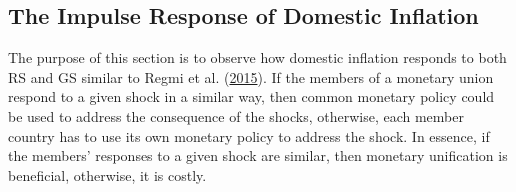 \documentclass[]{article}
\begin{document}
\begin{table}[t]

\caption{\label{tab:tab-def}Sample, Model and Definition of Global Variable}
\centering
{}
\end{table}

\FloatBarrier

\hypertarget{the-impulse-response-of-domestic-inflation}{%
\subsection{The Impulse Response of Domestic Inflation}\label{the-impulse-response-of-domestic-inflation}}

The purpose of this section is to observe how domestic inflation responds to both RS and GS similar to Regmi et al. (\protect\hyperlink{ref-Regmi2015}{2015}). If the members of a monetary union respond to a given shock in a similar way, then common monetary policy could be used to address the consequence of the shocks, otherwise, each member country has to use its own monetary policy to address the shock. In essence, if the members' responses to a given shock are similar, then monetary unification is beneficial, otherwise, it is costly.
\end{document}
